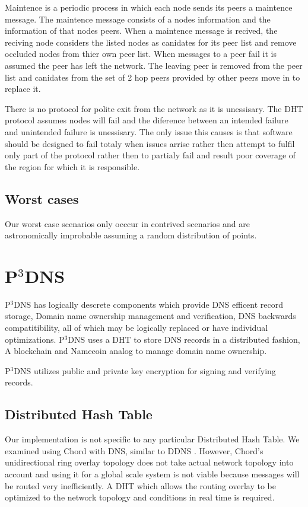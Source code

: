 \documentclass[11pt]{IEEEtran} %
\begin{document}
Maintence is a periodic process in which each node sends its peers a maintence message. The maintence message consists of a nodes information and the information of that nodes peers. When a maintence message is recived, the reciving node considers the listed nodes as canidates for its peer list and remove occluded nodes from thier own peer list. When messages to a peer fail it is assumed the peer has left the network. The leaving peer is removed from the peer list and canidates from the set of 2 hop peers provided by other peers move in to replace it.

There is no protocol for polite exit from the network as it is unessisary. The DHT protocol assumes nodes will fail and the diference between an intended failure and unintended failure is unessisary. The only issue this causes is that software should be designed to fail totaly when issues arrise rather then attempt to fulfil only part of the protocol rather then to partialy fail and result poor coverage of the region for which it is responsible.

\subsection{Worst cases}

Our worst case scenarios only occcur in contrived scenarios and are astronomically improbable assuming a random distribution of points.

\section{P$^{3}$DNS}
P$^{3}$DNS has logically descrete components which provide DNS efficent record storage, Domain name ownership management and verification, DNS backwards compatitibility, all of which may be logically replaced or have individual optimizations. P$^{3}$DNS uses a DHT to store DNS records in a distributed fashion, A blockchain and Namecoin\cite{namecoin} analog to manage domain name ownership.

P$^{3}$DNS utilizes public and private key encryption for signing and verifying records.


\subsection{Distributed Hash Table}
Our implementation is not specific to any particular Distributed Hash Table.  We examined using Chord \cite{chord} with DNS, similar to DDNS \cite{cox}.  However, Chord’s unidirectional ring overlay topology does not take actual network topology into account and using it for a global scale system is not viable because messages will be routed very inefficiently. A DHT which allows the routing overlay to be optimized to the network topology and conditions in real time is required.
\end{document}
